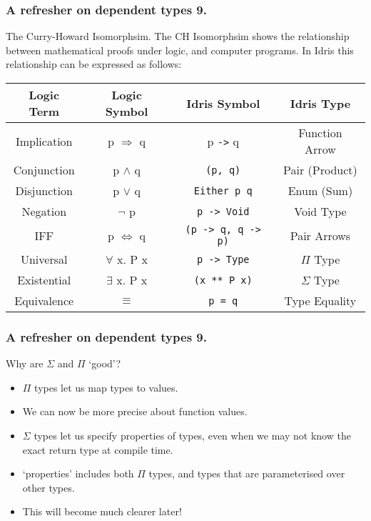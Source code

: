 \documentclass{beamer}
\begin{document}
\begin{frame}[fragile]
  \frametitle{A refresher on dependent types 9.}
  \begin{block}{The Curry-Howard Isomorphsim.}
  The CH Isomorphsim shows the relationship between mathematical
    proofs under logic, and computer programs. In Idris this
    relationship can be expressed as follows:
  \begin{table}[h!]
    \begin{tabular}{c|c|c|c}
    \textbf{Logic Term} & \textbf{Logic Symbol} & \textbf{Idris Symbol}
      & \textbf{Idris Type} \\
    \hline
      Implication & p $\Rightarrow$ q & p \texttt{->} q
      & Function Arrow \\
      Conjunction & p $\land$ q & \texttt{(p, q)} 
      & Pair (Product) \\
      Disjunction & p $\lor$ q & \texttt{Either p q}
      & Enum (Sum)\\
      Negation & $\lnot$ p & \texttt{p -> Void} &
      Void Type \\
      IFF & p $\iff$ q & \texttt{(p -> q, q -> p)}
      & Pair Arrows \\
      Universal & $\forall$ x. P x & 
      \texttt{p -> Type} & $\Pi$ Type \\
      Existential & $\exists$ x. P x
      & \texttt{(x ** P x)} & $\Sigma$ Type \\
      \hline
      Equivalence & $\equiv$ & \texttt{p = q} & Type Equality
    \end{tabular}
    
  \end{table}
  \end{block}
\end{frame}

\begin{frame}[fragile]
  \frametitle{A refresher on dependent types 9.}
  \begin{block}{Why are $\Sigma$ and $\Pi$ `good'?}
  \begin{itemize}
    \item $\Pi$ types let us map types to values.
    \item We can now be more precise about function values.
    \item $\Sigma$ types let us specify properties of types, even
      when we may not know the exact return type at compile time.
    \item `properties' includes both $\Pi$ types, and types that are
      parameterised over other types.
    \item This will become much clearer later!
  \end{itemize}
  \end{block}
\end{frame}
\end{document}
